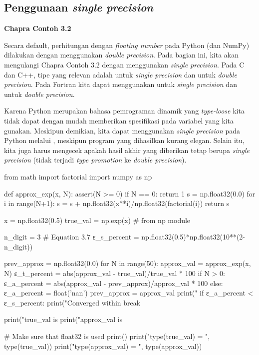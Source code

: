 \subsection{Penggunaan \textit{single precision}}

\textbf{Chapra Contoh 3.2}

Secara default, perhitungan dengan \textit{floating number} pada Python (dan NumPy)
dilakukan dengan menggunakan \textit{double precision}. Pada bagian ini, kita akan
mengulangi Chapra Contoh 3.2 dengan menggunakan \textit{single precision}.
Pada C dan C++, tipe yang relevan adalah 
untuk \textit{single precision} dan  untuk \textit{double
precision}.
Pada Fortran kita dapat menggunakan  untuk \textit{single precision}
dan  untuk \textit{double precision}.

Karena Python merupakan bahasa pemrograman dinamik yang \textit{type-loose} kita tidak dapat
dengan mudah memberikan spesifikasi pada variabel yang kita gunakan. Meskipun demikian, 
kita dapat menggunakan \textit{single precision} pada Python melalui
,
meskipun program yang dihasilkan kurang elegan. Selain itu, kita juga harus mengecek
apakah hasil akhir yang diberikan tetap berupa \textit{single precision} (tidak terjadi
\textit{type promotion} ke \textit{double precision}).

\begin{pythoncode}
from math import factorial
import numpy as np
  
def approx_exp(x, N):
    assert(N >= 0)
    if N == 0:
        return 1
    s = np.float32(0.0)
    for i in range(N+1):
        s = s + np.float32(x**i)/np.float32(factorial(i))
    return s
  
x = np.float32(0.5)
true_val = np.exp(x) # from np module
  
n_digit = 3
# Equation 3.7
ε_s_percent = np.float32(0.5)*np.float32(10**(2-n_digit))
  
prev_approx = np.float32(0.0)
for N in range(50):
    approx_val = approx_exp(x, N)
    ε_t_percent = abs(approx_val - true_val)/true_val * 100
    if N > 0:
        ε_a_percent = abs(approx_val - prev_approx)/approx_val * 100
    else:
        ε_a_percent = float('nan')
    prev_approx = approx_val
    print("%
    if ε_a_percent < ε_s_percent:
        print("Converged within %
        break
  
print("true_val   is %
print("approx_val is %
  
# Make sure that float32 is used
print()
print("type(true_val)   = ", type(true_val))
print("type(approx_val) = ", type(approx_val))
\end{pythoncode}

